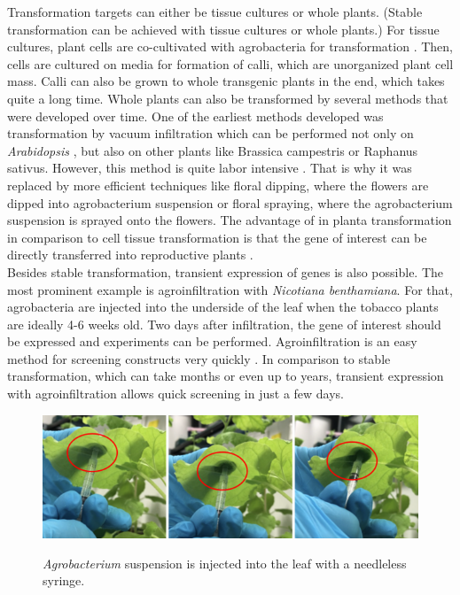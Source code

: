\noindent
Transformation targets can either be tissue cultures or whole plants. (Stable transformation can be achieved with tissue cultures or whole plants.) For tissue cultures, plant cells are co-cultivated with agrobacteria for transformation \parencite{Keshavareddy2018}. Then, cells are cultured on media for formation of calli, which are unorganized plant cell mass. Calli can also be grown to whole transgenic plants in the end, which takes quite a long time.
Whole plants can also be transformed by several methods that were developed over time. One of the earliest methods developed was transformation by vacuum infiltration which can be performed not only on \textit{Arabidopsis} \parencite{Clough1998}, but also on other plants like Brassica campestris or Raphanus sativus. However, this method is quite labor intensive \parencite{Keshavareddy2018}. That is why it was replaced by more efficient techniques like floral dipping, where the flowers are dipped into agrobacterium suspension or floral spraying, where the agrobacterium suspension is sprayed onto the flowers. The advantage of in planta transformation in comparison to cell tissue transformation is that the gene of interest can be directly transferred into reproductive plants \parencite{Keshavareddy2018}.
\\
Besides stable transformation, transient expression of genes is also possible. The most prominent example is agroinfiltration with \textit{Nicotiana benthamiana}. For that, agrobacteria are injected into the underside of the leaf when the tobacco plants are ideally 4-6 weeks old. Two days after infiltration, the gene of interest should be expressed and experiments can be performed. Agroinfiltration is an easy method for screening constructs very quickly \parencite{Bally2018}. In comparison to stable transformation, which can take months or even up to years, transient expression with agroinfiltration allows quick screening in just a few days. 

\begin{figure}[!htbp]
    \centering
    \includegraphics[width=\textwidth]{images/chap3/higher plants/image2.png}
    \label{fig:ch3high02}
    \caption{\textit{Agrobacterium} suspension is injected into the leaf with a needleless syringe.} 
\end{figure}
\FloatBarrier



